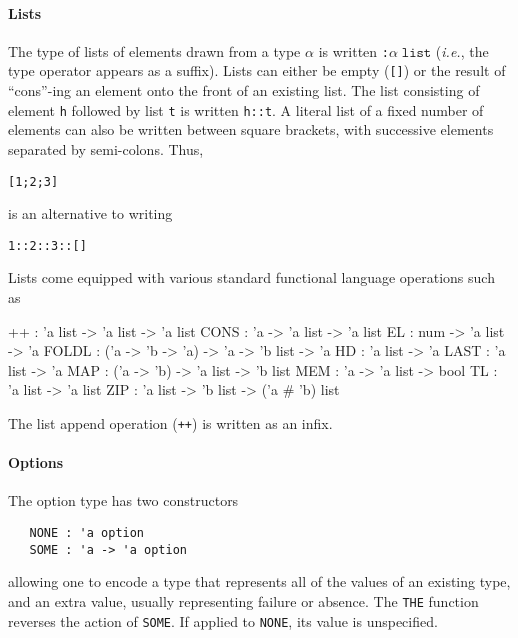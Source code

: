 \documentclass[11pt]{article}
\newcommand{\ie}{\emph{i.e.}}
\begin{document}
\paragraph{Lists} The type of lists of elements drawn from a type
$\alpha$ is written \texttt{:}$\alpha\;\texttt{list}$ (\ie, the type
operator appears as a suffix). Lists can either be empty (\texttt{[]})
or the result of ``cons''-ing an element onto the front of an existing
list.  The list consisting of element \texttt{h} followed by list
\texttt{t} is written \texttt{h::t}. A literal list of a fixed number
of elements can also be written between square brackets, with
successive elements separated by semi-colons.  Thus,
\begin{alltt}
   [1; 2; 3]
\end{alltt}
is an alternative to writing
\begin{alltt}
   1 :: 2 :: 3 :: []
\end{alltt}
Lists come equipped with various standard functional language
operations such as %
%
%
%
%
%
%
%
%
%
%
\begin{stdrule}
   ++    : 'a list -> 'a list -> 'a list
   CONS  : 'a -> 'a list -> 'a list
   EL    : num -> 'a list -> 'a
   FOLDL : ('a -> 'b -> 'a) -> 'a -> 'b list -> 'a
   HD    : 'a list -> 'a
   LAST  : 'a list -> 'a
   MAP   : ('a -> 'b) -> 'a list -> 'b list
   MEM   : 'a -> 'a list -> bool
   TL    : 'a list -> 'a list
   ZIP   : 'a list -> 'b list -> ('a # 'b) list
\end{stdrule}
The list append operation (\texttt{++}) is written as an infix.

\paragraph{Options} The option type has two constructors
%
%
\begin{verbatim}
   NONE : 'a option
   SOME : 'a -> 'a option
\end{verbatim}
allowing one to encode a type that represents all of the values of an
existing type, and an extra value, usually representing failure or
absence.  The %
%
\texttt{THE} function reverses the action of \texttt{SOME}.  If
applied to \texttt{NONE}, its value is unspecified.
\end{document}
